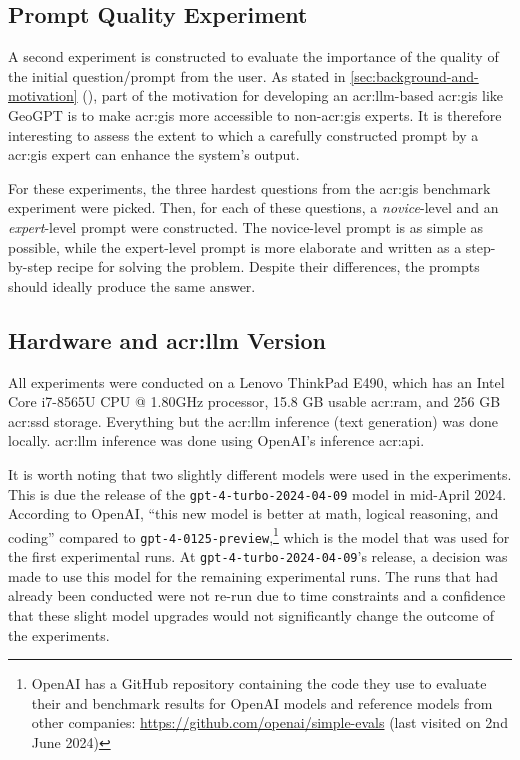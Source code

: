 \subsection{Prompt Quality Experiment}
\label{subsec:prompt-quality-test-setup}

A second experiment is constructed to evaluate the importance of the quality of the initial question/prompt from the user. As stated in \autoref{sec:background-and-motivation} (), part of the motivation for developing an \acrshort{acr:llm}-based \acrshort{acr:gis} like GeoGPT is to make \acrshort{acr:gis} more accessible to non-\acrshort{acr:gis} experts. It is therefore interesting to assess the extent to which a carefully constructed prompt by a \acrshort{acr:gis} expert can enhance the system's output.

For these experiments, the three hardest questions from the \acrshort{acr:gis} benchmark experiment were picked. Then, for each of these questions, a \textit{novice}-level and an \textit{expert}-level prompt were constructed. The novice-level prompt is as simple as possible, while the expert-level prompt is more elaborate and written as a step-by-step recipe for solving the problem. Despite their differences, the prompts should ideally produce the same answer.

\subsection[Hardware and LLM Version]{Hardware and \acrshort{acr:llm} Version}
\label{subsec:hardware-and-model-version}

All experiments were conducted on a Lenovo ThinkPad E490, which has an Intel{\textregistered} Core\texttrademark{} i7-8565U CPU @ 1.80GHz processor, 15.8 GB usable \acrshort{acr:ram}, and 256 GB \acrshort{acr:ssd} storage. Everything but the \acrshort{acr:llm} inference (text generation) was done locally. \acrshort{acr:llm} inference was done using OpenAI's inference \acrshort{acr:api}.

It is worth noting that two slightly different models were used in the experiments. This is due the release of the \texttt{gpt-4-turbo-2024-04-09} model in mid-April 2024. According to OpenAI, \enquote{this new model is better at math, logical reasoning, and coding} compared to \texttt{gpt-4-0125-preview},\footnote{OpenAI has a GitHub repository containing the code they use to evaluate their  and benchmark results for OpenAI models and reference models from other companies: \url{https://github.com/openai/simple-evals} (last visited on 2nd June 2024)} which is the model that was used for the first experimental runs. At \texttt{gpt-4-turbo-2024-04-09}'s release, a decision was made to use this model for the remaining experimental runs. The runs that had already been conducted were not re-run due to time constraints and a confidence that these slight model upgrades would not significantly change the outcome of the experiments.


